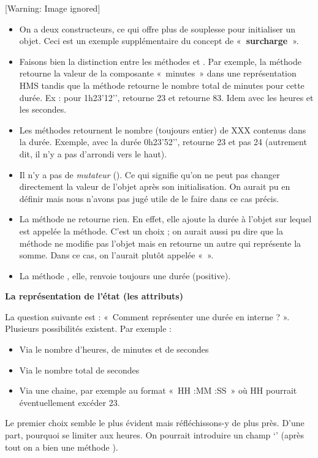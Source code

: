\begin{center}
 [Warning: Image ignored] %

\end{center}
\liststyleListv
\begin{itemize}
\item {
On a deux constructeurs, ce qui offre plus de souplesse pour initialiser
un objet. Ceci est un exemple supplémentaire du concept de
«\textbf{~surcharge~}».}
\item {
Faisons bien la distinction entre les méthodes
 et . Par
exemple, la méthode  retourne la valeur
de la composante «~minutes~» dans une représentation HMS tandis que la
méthode  retourne le nombre total
de minutes pour cette durée. Ex : pour 1h23’12’’,
 retourne 23 et
 retourne 83. Idem avec les heures
et les secondes.}
\item {
Les méthodes  retournent le nombre
(toujours entier) de XXX contenus dans la durée. Exemple, avec la durée
0h23’52'’, 
retourne 23 et pas 24 (autrement dit, il n’y a pas d’arrondi vers le
haut).}
\item {
Il n’y a pas de \textit{mutateur }(). Ce qui
signifie qu’on ne peut pas changer directement la valeur de l’objet
après son initialisation. On aurait pu en définir mais nous
n'avons pas jugé utile de le faire dans ce cas
précis.}
\item {
La méthode  ne retourne rien. En effet,
elle ajoute la durée à l’objet sur lequel est appelée la méthode. C’est
un choix ; on aurait aussi pu dire que la méthode ne modifie pas
l’objet mais en retourne un autre qui représente la somme. Dans ce cas,
on l’aurait plutôt appelée «~».}
\item {
La méthode , elle, renvoie toujours une
durée (positive).}
\end{itemize}
{\sffamily\bfseries
La représentation de l'état (les attributs)}

{
La question suivante est : «~Comment représenter une durée en interne ?
». Plusieurs possibilités existent. Par exemple :}

\liststyleListv
\begin{itemize}
\item {
Via le nombre d’heures, de minutes et de secondes}
\item {
Via le nombre total de secondes}
\item {
Via une chaine, par exemple au format «~HH :MM :SS~» où HH pourrait
éventuellement excéder 23.}
\end{itemize}
{
Le premier choix semble le plus évident mais réfléchissons-y de plus
près. D’une part, pourquoi se limiter aux heures. On pourrait
introduire un champ ‘’ (après tout on a bien
une méthode ). }

